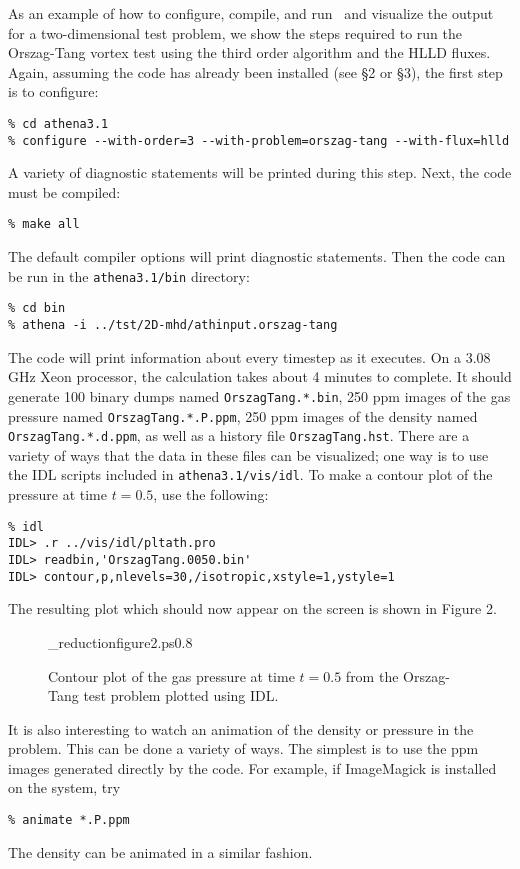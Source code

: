 As an example of how to configure, compile, and run \ath\ and visualize
the output for a two-dimensional test problem, we show the steps required
to run the Orszag-Tang vortex test using the third order algorithm and the
HLLD fluxes.
Again, assuming the code has already been
installed (see \S2 or \S3), the first step is to configure:
\begin{verbatim}
% cd athena3.1
% configure --with-order=3 --with-problem=orszag-tang --with-flux=hlld
\end{verbatim}
A variety of diagnostic statements will be printed during
this step.  Next, the code must be compiled:
\begin{verbatim}
% make all
\end{verbatim}
The default compiler options will print diagnostic statements.  Then
the code can be run in the {\tt athena3.1/bin} directory:
\begin{verbatim}
% cd bin
% athena -i ../tst/2D-mhd/athinput.orszag-tang
\end{verbatim}
The code will print information about every timestep as it executes.  On a 
3.08 GHz Xeon processor, the calculation takes about 4 minutes to complete.  It
should generate 100 binary dumps named {\tt OrszagTang.*.bin}, 250 ppm 
images of the gas pressure named {\tt OrszagTang.*.P.ppm}, 250 ppm
images of the density named {\tt OrszagTang.*.d.ppm},
as well as a history file {\tt OrszagTang.hst}.  There
are a variety of ways that the data in these files can be visualized; one
way is to use the IDL scripts included in {\tt athena3.1/vis/idl}.  To make a
contour plot of the pressure at time $t=0.5$, use the following:
\begin{verbatim}
% idl
IDL> .r ../vis/idl/pltath.pro
IDL> readbin,'OrszagTang.0050.bin'
IDL> contour,p,nlevels=30,/isotropic,xstyle=1,ystyle=1
\end{verbatim}

The resulting plot which should now appear on the screen is shown in Figure 2. 

\begin{figure}[htb!]
\plotone_reduction{figure2.ps}{0.8}
\caption{Contour plot of the gas pressure at time $t=0.5$ from
the Orszag-Tang test problem plotted using IDL.}
\end{figure}

It is also interesting to watch an animation of the density or
pressure in the problem.
This can be done a variety of ways.  The simplest is to use the ppm
images generated directly by the code.
For example, if ImageMagick is
installed on the system, try
\begin{verbatim}
% animate *.P.ppm
\end{verbatim}
The density can be animated in a similar fashion.

